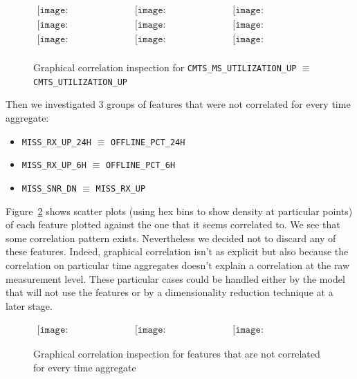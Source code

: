\begin{figure}[h]
\begin{center}$
\begin{array}{ccc}
\texttt{[image: correlation-1]} &
\texttt{[image: correlation-2]} &
\texttt{[image: correlation-3]}\\
\texttt{[image: correlation-4]} &
\texttt{[image: correlation-5]} &
\texttt{[image: correlation-6]}\\
\texttt{[image: correlation-7]} &
\texttt{[image: correlation-8]} &
\texttt{[image: correlation-9]}\\
\end{array}$
\end{center}
\caption{\label{correlation_insp}Graphical correlation inspection for \texttt{CMTS\_MS\_UTILIZATION\_UP} $\equiv$ \texttt{CMTS\_UTILIZATION\_UP}}
\end{figure}

Then we investigated 3 groups of features that were not correlated for every time aggregate:
\begin{itemize}[noitemsep,topsep=0pt]
	\item \texttt{MISS\_RX\_UP\_24H} $\equiv$ \texttt{OFFLINE\_PCT\_24H}
	\item \texttt{MISS\_RX\_UP\_6H}  $\equiv$ \texttt{OFFLINE\_PCT\_6H}
	\item \texttt{MISS\_SNR\_DN}  $\equiv$ \texttt{MISS\_RX\_UP}
\end{itemize}
Figure~\ref{almost_correlation_insp} shows scatter plots (using hex bins to show density at particular points) of each feature plotted against the one that it seems correlated to. We see that some correlation pattern exists. Nevertheless we decided not to discard any of these features. Indeed, graphical correlation isn't as explicit but also because the correlation on particular time aggregates doesn't explain a correlation at the raw measurement level. These particular cases could be handled either by the model that will not use the features or by a dimensionality reduction technique at a later stage.

\begin{figure}[h]
\begin{center}$
\begin{array}{ccc}
\texttt{[image: almost\_corr\_1]} &
\texttt{[image: almost\_corr\_2]} &
\texttt{[image: almost\_corr\_3]}
\end{array}$
\end{center}
\caption{\label{almost_correlation_insp} Graphical correlation inspection for features that are not correlated for every time aggregate}
\end{figure}


